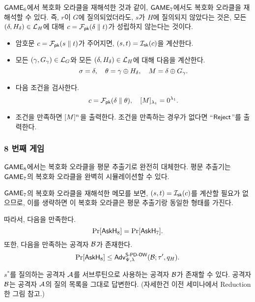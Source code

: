 \begin{memo}
	$\textsf{GAME}_6$에서 복호화 오라클을 재해석한 것과 같이, $\textsf{GAME}_7$에서도 복호화
	오라클을 재해석할 수 있다. 즉, $r$이 $G$에 질의되었더라도, $s$가 $H$에
	질의되지 않았다는 것은, 모든 $(\delta, H_{\delta}) \in \mathcal{L}_H$에 대해 $c =
	\mathcal{F}_{\textsf{pk}}(\delta \parallel t)$가 성립하지 않는다는 것이다. 
	\begin{tcolorbox}
		\begin{itemize}
			\item 암호문 $c = \mathcal{F}_{\textsf{pk}}(s \parallel t)$가 주어지면, $(s,t) =
			\mathcal{I}_{\textsf{sk}}(c)$을 계산한다.
			\item 모든 $(\gamma, G_\gamma) \in \mathcal{L}_G$와 모든 $(\delta,
			H_{\delta}) \in \mathcal{L}_H$에 대해 다음을 계산한다.
			$$
				\sigma = \delta, \quad \theta = \gamma \oplus H_{\delta}, \quad M = \delta \oplus G_{\gamma}.
			$$
			\item 다음 조건을 검사한다.
			$$
				c = \mathcal{F}_{\textsf{pk}}(\delta \parallel \theta), \quad [M]_{\lambda_1} = 0^{\lambda_1}.
			$$
			\item 조건을 만족하면 $[M]^{n}$을 출력한다. 조건을 만족하는
			경우가 없다면 “$\textsf{Reject}$”를 출력한다.
		\end{itemize}
	\end{tcolorbox}
\end{memo}

\newpage
\subsubsection{8 번째 게임}

$\textsf{GAME}_8$에서는 복호화 오라클을 평문 추출기로 완전히 대체한다. 평문 추출기는
$\textsf{GAME}_7$의 복호화 오라클을 완벽히 시뮬레이션할 수 있다. 

\begin{memo}
	$\textsf{GAME}_7$의 복호화 오라클을 재해석한 메모를 보면, $(s, t) = \mathcal{I}_{\textsf{sk}}(c)$를
	계산할 필요가 없으므로, 이를 생략하면 이 복호화 오라클은 평문 추출기랑
	동일한 형태를 가진다.
\end{memo}

따라서, 다음을 만족한다.
$$
	\Pr[\textsf{AskH}_8] = \Pr[\textsf{AskH}_7].
$$
또한, 다음을 만족하는 공격자 $\mathcal{B}$가 존재한다.
$$
	\Pr[\textsf{AskH}_8] \leq \textsf{Adv}^{\textsf{S-PD-OW}}_{\Psi, \lambda}(\mathcal{B}; \tau', q_{H}).
$$

\begin{memo}
	$s^*$를 질의하는 공격자 $\mathcal{A}$를 서브루틴으로 사용하는 공격자 $\mathcal{B}$가
	존재할 수 있다. 공격자 $\mathcal{B}$는 공격자 $\mathcal{A}$의 질의 목록을 그대로 답변한다.
	(자세한건 이전 세미나에서 Reduction한 그림 참고.)
\end{memo}


